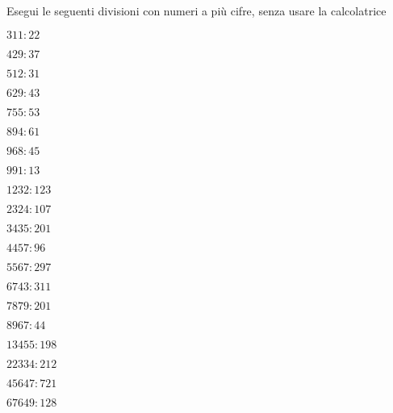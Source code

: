 
\begin{esercizio}
\label{ese:1.7}
 Esegui le seguenti divisioni con numeri a più cifre, senza usare la calcolatrice
\begin{multicols}{4}
 \begin{enumeratea}
 \item \(311:22\)
 \item \(429:37\)
 \item \(512:31\)
 \item \(629:43\)
 \item \(755:53\)
 \item \(894:61\)
 \item \(968:45\)
 \item \(991:13\)
 \item \(1232:123\)
 \item \(2324:107\)
 \item \(3435:201\)
 \item \(4457:96\)
 \item \(5567:297\)
 \item \(6743:311\)
 \item \(7879:201\)
 \item \(8967:44\)
 \item \(13455:198\)
 \item \(22334:212\)
 \item \(45647:721\)
 \item \(67649:128\)
 \end{enumeratea}
\end{multicols}
\end{esercizio}


